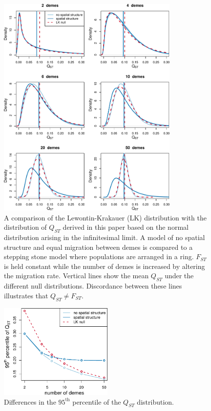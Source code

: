 \begin{figure}
  \centering
  \includegraphics[width=0.8\textwidth]{figures/qst_deme_compare.pdf}
  \caption{\small A comparison of the Lewontin-Krakauer (LK) distribution with
    the distribution of $Q_{ST}$ derived in this paper based on the normal
    distribution arising in the infinitesimal limit. A model of no spatial
    structure and equal migration between demes is compared to a stepping stone
    model where populations are arranged in a ring. $F_{ST}$ is held constant
    while the number of demes is increased by altering the migration rate.
    Vertical lines show the mean $Q_{ST}$ under the different null
    distributions. Discordance between these lines illustrates that $Q_{ST}
    \neq F_{ST}$. }
  \label{fig:qst_deme}
\end{figure}
\begin{figure}
  \centering
  \includegraphics[width=0.5\textwidth]{figures/qst_deme_percentile_nospace.pdf}
  \caption{\small Differences in the $95^{\mathrm{th}}$ percentile of the
    $Q_{ST}$ distribution.}
  \label{fig:qst_perc}
\end{figure}
